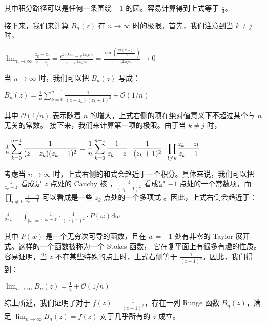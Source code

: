 \documentclass[12pt, a4paper, oneside]{article}
\begin{document}
\begin{spacing}{2.0}
其中积分路径可以是任何一条围绕 $-1$ 的圆。容易计算得到上式等于 $\frac{1}{4}$。

接下来，我们来计算 $B_n(z)$ 在 $n \to \infty$ 时的极限。首先，我们注意到当 $k \neq j$ 时，


\begin{center}
    $\displaystyle\lim_{n\to \infty}\frac{z_k - z_j}{z - z_j} = \frac{e^{2\pi ik/n}-e^{2\pi ij/n}}{z - e^{2\pi ij/n}} = \frac{\sin(\frac{2\pi (k-j)}{n})}{z - e^{2\pi ij/n}}\to 0$
\end{center}

当 $n \to \infty$ 时，我们可以把 $B_n(z)$ 写成：

\begin{center}
    $B_n(z) = \frac{1}{n}\displaystyle\sum_{k = 0}^{n-1}\frac{1}{(z - z_k)(z_k + 1)^2} + \mathcal{O}(1/n)$
\end{center}

其中 $\mathcal{O}(1/n)$ 表示随着 $n$ 的增大，上式右侧的项在绝对值意义下不超过某个与 $n$ 无关的常数。
接下来，我们来计算第一项的极限。由于当 $k \neq j$ 时，


\begin{center}
    $\frac{1}{n}\displaystyle\sum_{k = 0}^{n-1}\frac{1}{(z-z_k)(z_k - 1)^2} = \frac{1}{n}\displaystyle\sum_{k = 0}^{n-1}\frac{1}{z_k-z}\cdot \frac{1}{(z_k+1)^2} \cdot{\textstyle \displaystyle\prod_{l\neq k}}\frac{z_k - z_l}{z_k + 1}$
\end{center}

考虑当 $n \to \infty$ 时，上式右侧的和式会趋近于一个积分。具体来说，我们可以把 $\frac{1}{z_k-z}$ 看成是 $z$ 点处的 Cauchy 核
，$\frac{1}{(z_k+1)^2}$ 看成是 $-1$ 点处的一个常数项，而 $\displaystyle\prod_{l \neq k} \frac{z_k-z_l}{z_k+1}$ 可以看成是一些 $z_k$ 点处的一个多项式
。因此，上式右侧会趋近于：


\begin{center}
    $\frac{1}{2\pi i} = \displaystyle\int_{|\omega| = 1}\frac{1}{\omega - z}\cdot \frac{1}{(\omega+1)^2}\cdot P(\omega)\mathrm{d\omega}$
\end{center}

其中 $P(w)$ 是一个无穷次可导的函数，且在 $w=-1$ 处有非零的 Taylor 展开式。这样的一个函数被称为一个 Stokes 函数，
它在复平面上有很多有趣的性质。容易证明，当 $z$ 不在某些特殊的点上时，上式右侧等于 $\frac{1}{(z+1)^2}$。因此，我们得到：

\begin{center}
    $\displaystyle\lim_{n\to \infty}B_n(z) = \frac{1}{4} + \mathcal{O}(1/n)$
\end{center}

综上所述，我们证明了对于 $f(z) = \frac{1}{(z+1)^2}$，存在一列 Runge 函数 $B_n(z)$，满足 $\displaystyle\lim_{n \to \infty} B_n(z) = f(z)$ 
对于几乎所有的 $z$ 成立。












\end{spacing}{}



\end{document}
